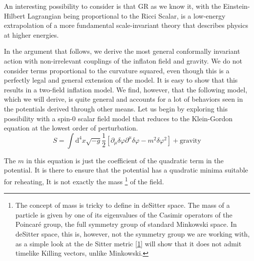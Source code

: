 \documentclass[aps,prd,reprint,preprintnumbers,showpacs,floatfix,nofootinbib,superscript address]{revtex4-2}
\begin{document}
An interesting possibility to consider is that GR as we know it, with the Einstein-Hilbert Lagrangian being proportional to the Ricci Scalar, is a low-energy extrapolation of a more fundamental scale-invariant theory that describes physics at higher energies. 

In the argument that follows, we derive the most general conformally invariant action with non-irrelevant couplings of the inflaton field and gravity. We do not consider terms proportional to the curvature squared, even though this is a perfectly legal and general extension of the model. It is easy to show that this results in a two-field inflation model. We find, however, that the following model, which we will derive, is quite general and accounts for a lot of behaviors seen in the potentials derived through other means. Let us begin by exploring this possibility with a spin-0 scalar field model that reduces to the Klein-Gordon equation at the lowest order of perturbation.
\begin{equation} \label{25}
    S = \int \mathrm{d}^4 x \sqrt{-g} \frac{1}{2} \left[ \partial_\mu \delta \varphi \partial^\mu \delta \varphi - m^2   \delta\varphi^2   \right] + \text{gravity}
\end{equation}

The $m$ in this equation is just the coefficient of the quadratic term in the potential. It is there to ensure that the potential has a quadratic minima suitable for reheating, It is not exactly the mass \footnote{The concept of mass is tricky to define in deSitter space. The mass of a particle is given by one of its eigenvalues of the Casimir operators of the Poincaré group, the full symmetry group of standard Minkowski space. In deSitter space, this is, however, not the symmetry group we are working with, as a simple look at the de Sitter metric \ref{1} will show that it does not admit timelike Killing vectors, unlike Minkowski.} of the field.

\end{document}
